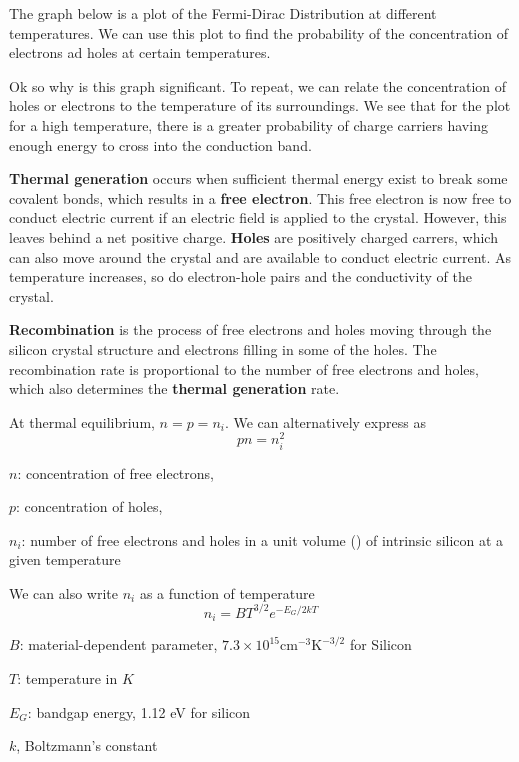 The graph below is a plot of the Fermi-Dirac Distribution at different temperatures. We can use this plot to find the probability of the concentration of electrons ad holes at certain temperatures.



Ok so why is this graph significant. To repeat, we can relate the concentration of holes or electrons to the temperature of its surroundings. We see that for the plot for a high temperature, there is a greater probability of charge carriers having enough energy to cross into the conduction band.

\textbf{Thermal generation} occurs when sufficient thermal energy exist to break some covalent bonds, which results in a \textbf{free electron}. This free electron is now free to conduct electric current if an electric field is applied to the crystal. However, this leaves behind a net positive charge. \textbf{Holes} are positively charged carrers, which can also move around the crystal and are available to conduct electric current. As temperature increases, so do electron-hole pairs and the conductivity of the crystal. 

\textbf{Recombination} is the process of free electrons and  holes moving through the silicon crystal structure and electrons filling in some of the holes. The recombination rate is proportional to the number of free electrons and holes, which also determines the \textbf{thermal generation} rate.

At thermal equilibrium, $n = p = n_i$. We can alternatively express as
\[pn = n_i^2\]
\begin{gline}
    \item $n$: concentration of free electrons, \unit{\concentration}
    \item $p$: concentration of holes, \unit{\concentration}
    \item $n_i$: number of free electrons and holes in a unit volume (\unit{\concentration}) of intrinsic silicon at a given temperature
\end{gline}

We can also write $n_i$ as a function of temperature
\[n_i = BT^{3/2} e^{-E_G / 2kT}\]
\begin{gline}
    \item $B$: material-dependent parameter, $7.3 \times 10^{15} \text{cm}^{-3} \text{K}^{-3/2}$ for Silicon
    \item $T$: temperature in $K$
    \item $E_G$: bandgap energy, 1.12 eV for silicon
    \item $k$, Boltzmann's constant
\end{gline}

